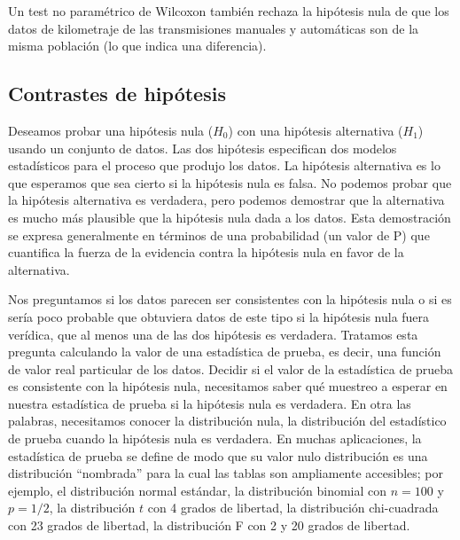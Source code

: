 \documentclass[]{article}
\numberwithin{equation}{section}
\begin{document}
Un test no paramétrico de Wilcoxon también rechaza la hipótesis nula de
que los datos de kilometraje de las transmisiones manuales y automáticas
son de la misma población (lo que indica una diferencia).

\subsection{Contrastes de hipótesis}\label{contrastes-de-hipotesis}

Deseamos probar una hipótesis nula (\(H_0\)) con una hipótesis
alternativa (\(H_1\)) usando un conjunto de datos. Las dos hipótesis
especifican dos modelos estadísticos para el proceso que produjo los
datos. La hipótesis alternativa es lo que esperamos que sea cierto si la
hipótesis nula es falsa. No podemos probar que la hipótesis alternativa
es verdadera, pero podemos demostrar que la alternativa es mucho más
plausible que la hipótesis nula dada a los datos. Esta demostración se
expresa generalmente en términos de una probabilidad (un valor de P) que
cuantifica la fuerza de la evidencia contra la hipótesis nula en favor
de la alternativa.

Nos preguntamos si los datos parecen ser consistentes con la hipótesis
nula o si es sería poco probable que obtuviera datos de este tipo si la
hipótesis nula fuera verídica, que al menos una de las dos hipótesis es
verdadera. Tratamos esta pregunta calculando la valor de una estadística
de prueba, es decir, una función de valor real particular de los datos.
Decidir si el valor de la estadística de prueba es consistente con la
hipótesis nula, necesitamos saber qué muestreo a esperar en nuestra
estadística de prueba si la hipótesis nula es verdadera. En otra las
palabras, necesitamos conocer la distribución nula, la distribución del
estadístico de prueba cuando la hipótesis nula es verdadera. En muchas
aplicaciones, la estadística de prueba se define de modo que su valor
nulo distribución es una distribución ``nombrada'' para la cual las
tablas son ampliamente accesibles; por ejemplo, el distribución normal
estándar, la distribución binomial con \(n = 100\) y \(p = 1/2\), la
distribución \(t\) con 4 grados de libertad, la distribución
chi-cuadrada con 23 grados de libertad, la distribución F con 2 y 20
grados de libertad.
\end{document}
